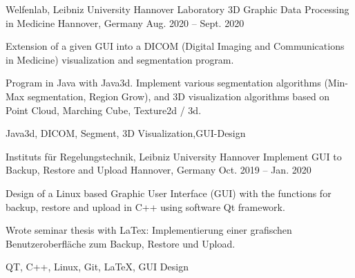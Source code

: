
\begin{cventries}
\cventry
{Welfenlab, Leibniz University Hannover} %
{Laboratory 3D Graphic Data Processing in Medicine} %
{Hannover, Germany} %
{Aug. 2020 – Sept. 2020} %
{
	\begin{cvitems} %
 		\item {Extension of a given GUI into a DICOM (Digital Imaging and Communications in Medicine) visualization and segmentation program.}
 		\item {Program in Java with Java3d. Implement various segmentation algorithms (Min-Max segmentation, Region Grow), and 3D visualization algorithms based on Point Cloud, Marching Cube, Texture2d / 3d.}
 	\end{cvitems}
}
{Java3d, DICOM, Segment, 3D Visualization,GUI-Design}


\cventry
{Instituts für Regelungstechnik, Leibniz University Hannover} %
{Implement GUI to Backup, Restore and Upload} %
{Hannover, Germany} %
{Oct. 2019 – Jan. 2020} %
{
	\begin{cvitems} %
		\item {Design of a Linux based Graphic User Interface (GUI) with the functions for backup, restore and upload in C++ using software Qt framework.}
		\item {Wrote seminar thesis with LaTex: Implementierung einer grafischen Benutzeroberfläche zum Backup, Restore und Upload.}
	\end{cvitems}
	}
{QT, C++, Linux, Git, \LaTeX, GUI Design}


\end{cventries}
